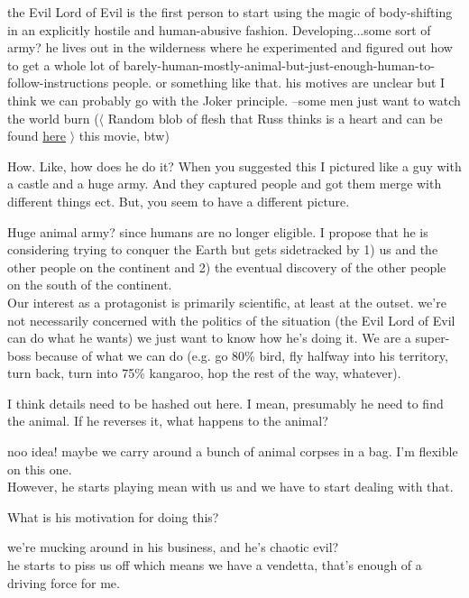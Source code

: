 the Evil Lord of Evil is the first person to start using the magic of
body-shifting in an explicitly hostile and human-abusive fashion.
Developing...some sort of army? he lives out in the wilderness where he
experimented and figured out how to get a whole lot of
barely-human-mostly-animal-but-just-enough-human-to-follow-instructions people.
or something like that.  his motives are unclear but I think we can probably go
with the Joker principle. --some men just want to watch the world burn
($\langle$ Random blob of flesh that Russ thinks is a heart and can be found
\href{http://fatnewsfeed.com/wordpress/wp-content/uploads/2010/10/heart\_cropped.jpg}{here}
$\rangle$ this movie, btw) 

\A How. Like, how does he do it? When you suggested this I pictured like a guy
with a castle and a huge army. And they captured people and got them merge with
different things ect. But, you seem to have a different picture. 

\R Huge animal army? since humans are no longer eligible.  I propose that he is
considering trying to conquer the Earth but gets sidetracked by 1) us and the
other people on the continent and 2) the eventual discovery of the other people
on the south of the continent. \\

Our interest as a protagonist is primarily scientific, at least at the outset.
we're not necessarily concerned with the politics of the situation (the Evil
Lord of Evil can do what he wants) we just want to know how he's doing it.  We
are a super-boss because of what we can do (e.g. go 80\% bird, fly halfway into
his territory, turn back, turn into 75\% kangaroo, hop the rest of the way,
whatever).  

\A I think details need to be hashed out here. I mean, presumably he need to
find the animal. If he reverses it, what happens to the animal?

\R noo idea! maybe we carry around a bunch of animal corpses in a bag. I'm
flexible on this one. \\

However, he starts playing mean with us and we have to start dealing with that.  

\A What is his motivation for doing this?

\R we're mucking around in his business, and he's chaotic evil? \\

he starts to piss us off which means we have a vendetta, that's enough of a
driving force for me. \\

